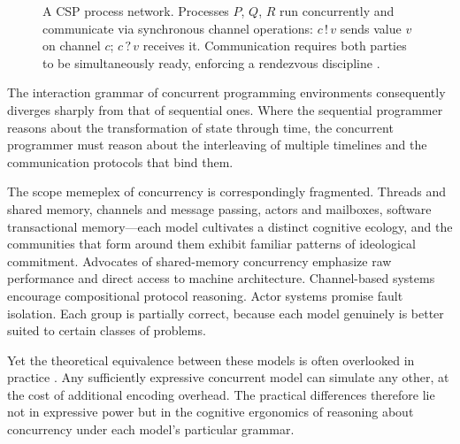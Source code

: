 \documentclass[12pt]{article}
\theoremstyle{definition}
\begin{document}
\begin{figure}[h]
\centering
{}
\caption{A \textsf{CSP} process network. Processes $P$, $Q$, $R$ run
concurrently and communicate via synchronous channel operations:
$c\,!\,v$ sends value $v$ on channel $c$; $c\,?\,v$ receives it.
Communication requires both parties to be simultaneously ready,
enforcing a rendezvous discipline \cite{hoare1985}.}
\label{fig:csp}
\end{figure}

The interaction grammar of concurrent programming environments
consequently diverges sharply from that of sequential ones. Where the
sequential programmer reasons about the transformation of state through
time, the concurrent programmer must reason about the interleaving of
multiple timelines and the communication protocols that bind them.

The scope memeplex of concurrency is correspondingly fragmented. Threads
and shared memory, channels and message passing, actors and mailboxes,
software transactional memory---each model cultivates a distinct
cognitive ecology, and the communities that form around them exhibit
familiar patterns of ideological commitment. Advocates of shared-memory
concurrency emphasize raw performance and direct access to machine
architecture. Channel-based systems encourage compositional protocol
reasoning. Actor systems promise fault isolation. Each group is partially
correct, because each model genuinely is better suited to certain classes
of problems.

Yet the theoretical equivalence between these models is often
overlooked in practice \cite{kleene1952}. Any sufficiently expressive
concurrent model can simulate any other, at the cost of additional
encoding overhead. The practical differences therefore lie not in
expressive power but in the cognitive ergonomics of reasoning about
concurrency under each model's particular grammar.
\end{document}

